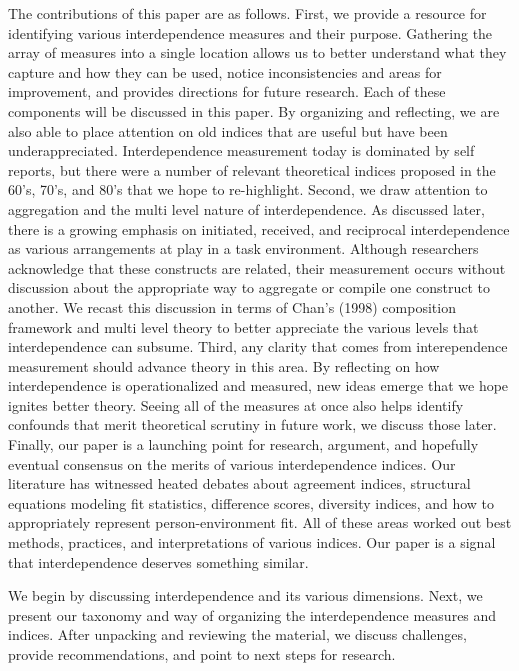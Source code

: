 \documentclass[english,,man]{apa6}
\theoremstyle{definition}
\theoremstyle{definition}
\theoremstyle{definition}
\theoremstyle{remark}
\begin{document}
The contributions of this paper are as follows. First, we provide a
resource for identifying various interdependence measures and their
purpose. Gathering the array of measures into a single location allows
us to better understand what they capture and how they can be used,
notice inconsistencies and areas for improvement, and provides
directions for future research. Each of these components will be
discussed in this paper. By organizing and reflecting, we are also able
to place attention on old indices that are useful but have been
underappreciated. Interdependence measurement today is dominated by self
reports, but there were a number of relevant theoretical indices
proposed in the 60's, 70's, and 80's that we hope to re-highlight.
Second, we draw attention to aggregation and the multi level nature of
interdependence. As discussed later, there is a growing emphasis on
initiated, received, and reciprocal interdependence as various
arrangements at play in a task environment. Although researchers
acknowledge that these constructs are related, their measurement occurs
without discussion about the appropriate way to aggregate or compile one
construct to another. We recast this discussion in terms of Chan's
(1998) composition framework and multi level theory to better appreciate
the various levels that interdependence can subsume. Third, any clarity
that comes from interependence measurement should advance theory in this
area. By reflecting on how interdependence is operationalized and
measured, new ideas emerge that we hope ignites better theory. Seeing
all of the measures at once also helps identify confounds that merit
theoretical scrutiny in future work, we discuss those later. Finally,
our paper is a launching point for research, argument, and hopefully
eventual consensus on the merits of various interdependence indices. Our
literature has witnessed heated debates about agreement indices,
structural equations modeling fit statistics, difference scores,
diversity indices, and how to appropriately represent person-environment
fit. All of these areas worked out best methods, practices, and
interpretations of various indices. Our paper is a signal that
interdependence deserves something similar.

We begin by discussing interdependence and its various dimensions. Next,
we present our taxonomy and way of organizing the interdependence
measures and indices. After unpacking and reviewing the material, we
discuss challenges, provide recommendations, and point to next steps for
research.
\end{document}
